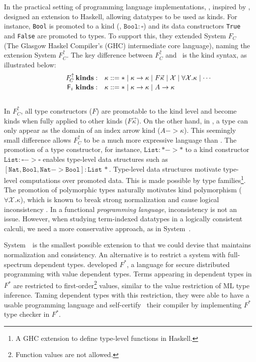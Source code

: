 In the practical setting of programming language implementations,
\citet{YorgeyWCJVM12}, inspired by \citet{SHE}, designed an extension
to Haskell, allowing datatypes to be used as kinds. For instance, \texttt{Bool}
is promoted to a kind (\ie, $\texttt{Bool}:\square$) and its data constructors
\texttt{True} and \texttt{False} are promoted to types. To support this,
they extended System $F_{\!C}$ (The Glasgow Haskel Compiler's (GHC) intermediate core language), 
naming the extension System $F_{\!C}^\uparrow$.
The key difference between $F_{\!C}^\uparrow$ and \Fi\ is the kind syntax, as illustrated below: \vspace*{-2pt}
\[\qquad\quad
\begin{array}{ll}
F_{\!C}^\uparrow\,\textbf{kinds}: &
\kappa ::= * \mid \kappa -> \kappa \mid F \vec{\kappa} \mid \mathcal{X} \mid \forall \mathcal{X}.\kappa \mid \cdots \\
\,\Fi\,\,\textbf{kinds}: &
\kappa ::= * \mid \kappa -> \kappa \mid A -> \kappa \phantom{A^{A^A}}
\end{array}  
\] ~\vspace*{-6pt}\\
In $F_{\!C}^\uparrow$, all type constructors ($F$) are promotable to the 
kind level and become kinds when fully applied to other kinds
($F\vec\kappa$). On the other hand, in \Fi,  a type can only appear
as the domain of an index arrow kind ($A-> \kappa$). This seemingly small
difference allows $F_{\!C}^\uparrow$ to be a much
more expressive language than \Fi. The promotion of
a type constructor, for instance, $\texttt{List}:* -> *$ to a kind constructor
$\texttt{List}:\square-> \square$ enables type-level data structures
such as $\mathtt{[Nat,Bool,Nat-> Bool]:List\,*}$. Type-level
data structures motivate type-level computations over promoted data.
This is made possible by type families\footnote{
	A GHC extension to define type-level functions in Haskell.}.
The promotion of polymorphic types naturally motivates
kind polymorphism ($\forall \mathcal{X}.\kappa$), which is known to
break strong normalization and cause logical inconsistency \cite{Girard72}.
In a functional {\em programming language},
inconsistency is not an issue. However, when studying
term-indexed datatypes in a logically consistent calculi, we need
a more conservative approach, as in System~\Fi.

System~\Fi\ is the smallest possible
extension to \Fw that we could devise that maintains normalization and consistency.
An alternative is to restrict a system with full-spectrum dependent types.
\citet{Swamy11} developed $F^{*}$,
a language for secure distributed programming with value dependent types.
Terms appearing in dependent types in $F^{*}$ are restricted to first-order\footnote{Function values are not allowed.}
values, similar to the value restriction of ML type inference. 
Taming dependent types with this restriction, they were able to have a usable programming language
and self-certify~\cite{Strub12} their compiler by implementing $F^{*}$
type checker in $F^{*}$.

